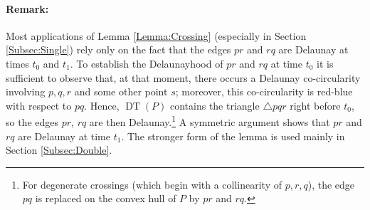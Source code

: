 \documentclass[letter,11pt]{article}
\def\DT{\mathop{\mathrm{DT}}}
\begin{document}
\paragraph{Remark:}
Most applications of Lemma \ref{Lemma:Crossing} (especially in Section \ref{Subsec:Single}) 
rely only on the fact that the edges $pr$ and $rq$
are Delaunay at times $t_0$ and $t_1$.
To establish the Delaunayhood of $pr$ and $rq$ at time $t_0$ it is sufficient to observe that, at that moment, there occurs a Delaunay co-circularity involving $p,q,r$ and some other point $s$; moreover, this co-circularity is red-blue with respect to $pq$. Hence, $\DT(P)$ contains the triangle $\triangle pqr$ right before $t_0$, so the edges $pr$, $rq$ are then Delaunay.\footnote{For degenerate crossings (which begin with a collinearity of $p,r,q$), the edge $pq$ is replaced on the convex hull of $P$ by $pr$ and $rq$.}
A symmetric argument shows that $pr$ and $rq$ are Delaunay at time $t_1$. 
The stronger form of the lemma is used mainly in Section \ref{Subsec:Double}.
\end{document}
